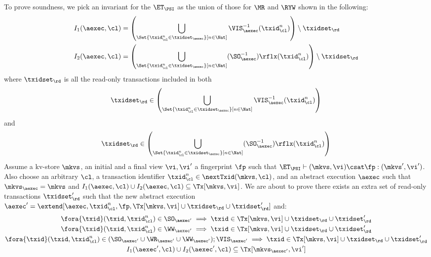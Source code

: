 To prove soundness, we pick an invariant for the \( \ET_\PSI \) as the union of those for \( \MR\) and \( \RYW \) shown in the following:
\begin{align*}
    I_1(\aexec, \cl) & =  \left( \bigcup_{\Set{\txid_{\cl}^{n} \in \txidset_{\aexec} }[ n \in \Nat ]} \VIS_{\aexec}^{-1}(\txid^n_\cl) \right) \setminus \txidset_\rd \\
    I_2(\aexec, \cl) & =  \left( \bigcup_{\Set{\txid_{\cl}^{n} \in \txidset_{\aexec} }[ n \in \Nat ]} (\SO_{\aexec}^{-1})\rflx(\txid^n_\cl) \right) \setminus \txidset_\rd
\end{align*}
where \( \txidset_\rd \) is all the read-only transactions included in both 
\[ \txidset_\rd \in \left( \bigcup_{\Set{\txid_{\cl}^{n} \in \txidset_{\aexec} }[ n \in \Nat ]} \VIS_{\aexec}^{-1}(\txid^n_\cl) \right)\]
and \[ \txidset_\rd  \in \left( \bigcup_{\Set{\txid_{\cl}^{n} \in \txidset_{\aexec} }[ n \in \Nat ]} (\SO_{\aexec}^{-1})\rflx(\txid^n_\cl) \right) \]
Assume a kv-store $\mkvs$, an initial and a final view $\vi, \vi'$  a fingerprint $\fp$ 
such that $\ET_{\PSI} \vdash (\mkvs, \vi) \csat \fp: (\mkvs',\vi')$. 
Also choose an arbitrary $\cl$, a transaction identifier $\txid_\cl^n \in \nextTxid(\mkvs, \cl)$, 
and an abstract execution $\aexec$ such that $\mkvs_{\aexec} = \mkvs$ and 
\( I_1(\aexec, \cl) \cup I_2(\aexec, \cl) \subseteq \Tx[\mkvs, \vi] \).
We are about to prove there exists an extra set of read-only transactions \( \txidset'_\rd \) such that
the new abstract execution \( \aexec' = \extend[\aexec, \txid_\cl^n, \fp, \Tx[\mkvs, \vi] \cup \txidset_\rd \cup \txidset'_\rd] \) and:
\begin{gather}
    \fora{\txid} (\txid, \txid_\cl^n) \in \SO_{\aexec'} \implies \txid \in \Tx[\mkvs, \vi] \cup \txidset_\rd \cup \txidset'_\rd \label{equ:psi-sound-update-so}\\
    \fora{\txid} (\txid, \txid_\cl^n) \in \WW_{\aexec'} \implies \txid \in \Tx[\mkvs, \vi] \cup \txidset_\rd \cup \txidset'_\rd \label{equ:psi-sound-update-ua}\\
    \fora{\txid} (\txid, \txid_\cl^n) \in ( \SO_{\aexec'} \cup \WR_{\aexec'} \cup \WW_{\aexec'} ) ; \VIS_{\aexec'} \implies \txid \in \Tx[\mkvs, \vi] \cup \txidset_\rd \cup \txidset'_\rd \label{equ:psi-sound-update-closure}\\
    I_1(\aexec',\cl) \cup I_2(\aexec',\cl) \subseteq \Tx[\mkvs_{\aexec'}, \vi'] \label{equ:psi-sound-inv} 
\end{gather}
